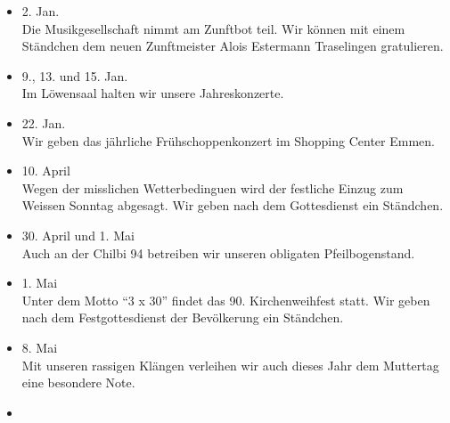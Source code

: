\begin{history}


    \begin{itemize}

        \item[]2. Jan.\\
        Die Musikgesellschaft nimmt am Zunftbot teil.
        Wir können mit einem Ständchen dem neuen Zunftmeister Alois Estermann
        Traselingen gratulieren.

        \item[]9., 13. und 15. Jan.\\
        Im Löwensaal halten wir unsere Jahreskonzerte.

        \item[]22. Jan.\\
        Wir geben das jährliche Frühschoppenkonzert im Shopping Center Emmen.

        \item[]10. April\\
        Wegen der misslichen Wetterbedinguen wird der festliche Einzug zum Weissen Sonntag abgesagt.
        Wir geben nach dem Gottesdienst ein Ständchen.

        \item[]30. April und 1. Mai\\
        Auch an der Chilbi 94 betreiben wir unseren obligaten Pfeilbogenstand.

        \item[]1. Mai\\
        Unter dem Motto \enquote{3 x 30} findet das 90. Kirchenweihfest statt. Wir geben nach dem Festgottesdienst der Bevölkerung ein Ständchen.

        \item[]8. Mai\\
        Mit unseren rassigen Klängen verleihen wir auch dieses Jahr dem Muttertag eine besondere Note.

        \item[]\\


    \end{itemize}

\end{history}
